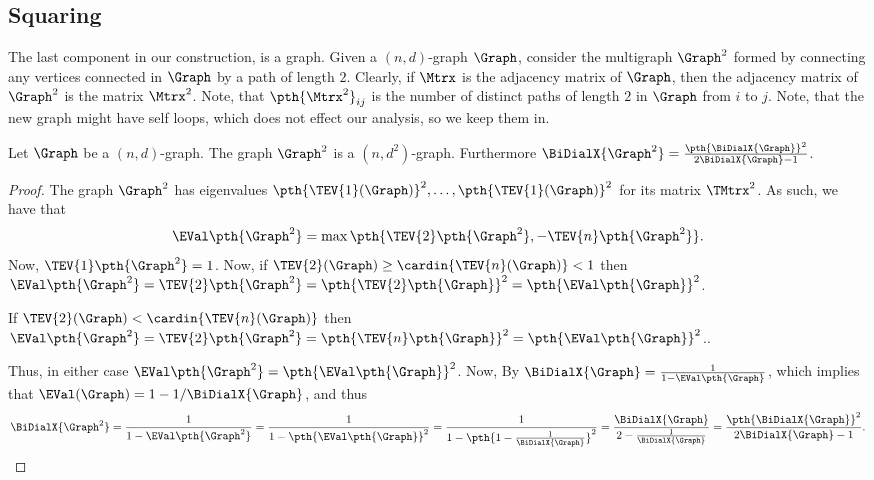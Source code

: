 \subsection{Squaring}

The last component in our construction, is
 a graph. Given a $(n,d)$-graph
$\Graph$, consider the multigraph $\Graph^2$ formed by connecting any vertices
connected in $\Graph$ by a path of length $2$. Clearly, if $\Mtrx$ is
the adjacency matrix of $\Graph$, then the adjacency matrix of
$\Graph^2$ is the matrix $\Mtrx^2$. Note, that $\pth{\Mtrx^2}_{ij}$ is
the number of distinct paths of length $2$ in $\Graph$ from $i$ to
$j$. Note, that the new graph might have self loops, which does not
effect our analysis, so we keep them in. 

\begin{lemma}
    Let $\Graph$ be a $(n,d)$-graph.  The graph $\Graph^2$ is a
    $(n,d^2)$-graph. Furthermore $\BiDialX{\Graph^2} =
    \frac{\pth{\BiDialX{\Graph}}^2}{2\BiDialX{\Graph} - 1}$.
\end{lemma}

\begin{proof}
    The graph $\Graph^2$ has eigenvalues $\pth{\TEV{1}(\Graph)}^2,
    \ldots, \pth{\TEV{1}(\Graph)}^2$ for its matrix $\TMtrx^2$. As
    such, we have that
    \[
    \EVal\pth{\Graph^2} = \max\pth{\TEV{2}\pth{\Graph^2},
       -\TEV{n}\pth{\Graph^2}}.
    \]
    Now, $\TEV{1}\pth{\Graph^2} = 1$. Now, if $\TEV{2}(\Graph) \geq
    \cardin{\TEV{n}(\Graph)} < 1$ then $\EVal\pth{\Graph^2} =
    \TEV{2}\pth{\Graph^2} = \pth{\TEV{2}\pth{\Graph}}^2 =
    \pth{\EVal\pth{\Graph}}^2$.

    If $\TEV{2}(\Graph) < \cardin{\TEV{n}(\Graph)}$ then
    $\EVal\pth{\Graph^2} = \TEV{2}\pth{\Graph^2} = 
    \pth{\TEV{n}\pth{\Graph}}^2 = \pth{\EVal\pth{\Graph}}^2$..
    
    Thus, in either case $\EVal\pth{\Graph^2} =
    \pth{\EVal\pth{\Graph}}^2$. Now, By 
    $\BiDialX{\Graph} = \frac{1}{1-\EVal\pth{\Graph}}$, which implies
    that $\EVal(\Graph) = 1- 1/\BiDialX{\Graph}$, and thus
    \begin{align*}
        \BiDialX{\Graph^2}%
        = %
        \frac{1}{1-\EVal\pth{\Graph^2}}%
        =%
        \frac{1}{1-\pth{\EVal\pth{\Graph}}^2}%
        =%
        \frac{1}{1-\pth{1- \frac{1}{\BiDialX{\Graph}}}^2}%
        =%
        \frac{\BiDialX{\Graph}}{2- \frac{1}{\BiDialX{\Graph}}}%
        =%
        \frac{\pth{\BiDialX{\Graph}}^2}{2\BiDialX{\Graph} - 1}.
    \end{align*}
\end{proof}


